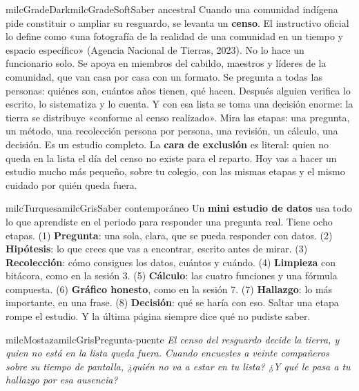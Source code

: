 \documentclass[11pt,letterpaper]{article}
\begin{document}
\begin{softbox}{milcGradeDark}{milcGradeSoft}{Saber ancestral}
Cuando una comunidad indígena pide constituir o ampliar su resguardo, se levanta un \textbf{censo}. El instructivo oficial lo define como «una fotografía de la realidad de una comunidad en un tiempo y espacio específico» (Agencia Nacional de Tierras, 2023). No lo hace un funcionario solo. Se apoya en miembros del cabildo, maestros y líderes de la comunidad, que van casa por casa con un formato. Se pregunta a todas las personas: quiénes son, cuántos años tienen, qué hacen. Después alguien verifica lo escrito, lo sistematiza y lo cuenta. Y con esa lista se toma una decisión enorme: la tierra se distribuye «conforme al censo realizado». Mira las etapas: una pregunta, un método, una recolección persona por persona, una revisión, un cálculo, una decisión. Es un estudio completo. La \textbf{cara de exclusión} es literal: quien no queda en la lista el día del censo no existe para el reparto. Hoy vas a hacer un estudio mucho más pequeño, sobre tu colegio, con las mismas etapas y el mismo cuidado por quién queda fuera.\par{}
\end{softbox}

\begin{softbox}{milcTurquesa}{milcGris}{Saber contemporáneo}
Un \textbf{mini estudio de datos} usa todo lo que aprendiste en el periodo para responder una pregunta real. Tiene ocho etapas. (1) \textbf{Pregunta}: una sola, clara, que se pueda responder con datos. (2) \textbf{Hipótesis}: lo que crees que vas a encontrar, escrito antes de mirar. (3) \textbf{Recolección}: cómo consigues los datos, cuántos y cuándo. (4) \textbf{Limpieza} con bitácora, como en la sesión 3. (5) \textbf{Cálculo}: las cuatro funciones y una fórmula compuesta. (6) \textbf{Gráfico honesto}, como en la sesión 7. (7) \textbf{Hallazgo}: lo más importante, en una frase. (8) \textbf{Decisión}: qué se haría con eso. Saltar una etapa rompe el estudio. Y la última página siempre dice qué no pudiste saber.
\end{softbox}

\begin{softbox}{milcMostaza}{milcGris}{Pregunta-puente}
\textit{El censo del resguardo decide la tierra, y quien no está en la lista queda fuera. Cuando encuestes a veinte compañeros sobre su tiempo de pantalla, ¿quién no va a estar en tu lista? ¿Y qué le pasa a tu hallazgo por esa ausencia?}
\end{softbox}
\end{document}
